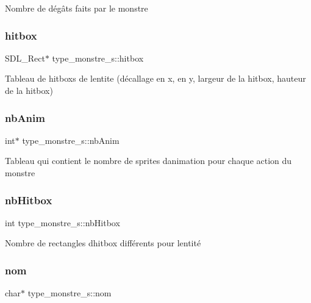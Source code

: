 Nombre de dégâts faits par le monstre \mbox{\label{structtype__monstre__s_aa29ee89bd23e0d9d025e61b831eef91e}} 
\subsubsection{\texorpdfstring{hitbox}{hitbox}}
{\footnotesize\ttfamily S\+D\+L\+\_\+\+Rect$\ast$ type\+\_\+monstre\+\_\+s\+::hitbox}

Tableau de hitboxs de l\textquotesingle{}entite (décallage en x, en y, largeur de la hitbox, hauteur de la hitbox) \mbox{\label{structtype__monstre__s_aecf18b6fa00e710fe27de2d1b738e62c}} 
\subsubsection{\texorpdfstring{nb\+Anim}{nbAnim}}
{\footnotesize\ttfamily int$\ast$ type\+\_\+monstre\+\_\+s\+::nb\+Anim}

Tableau qui contient le nombre de sprites d\textquotesingle{}animation pour chaque action du monstre \mbox{\label{structtype__monstre__s_a5a14ba0498c9fdf7221d788171adafce}} 
\subsubsection{\texorpdfstring{nb\+Hitbox}{nbHitbox}}
{\footnotesize\ttfamily int type\+\_\+monstre\+\_\+s\+::nb\+Hitbox}

Nombre de rectangles d\textquotesingle{}hitbox différents pour l\textquotesingle{}entité \mbox{\label{structtype__monstre__s_a18520dadfa451022be8dd63b86a1943c}} 
\subsubsection{\texorpdfstring{nom}{nom}}
{\footnotesize\ttfamily char$\ast$ type\+\_\+monstre\+\_\+s\+::nom}

